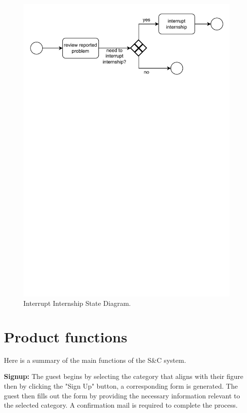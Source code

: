 \begin{figure}[H]
    \begin{center}
        \includegraphics[width=\linewidth]{Images/StateDiagram/InterruptInternship.pdf}
        \caption{Interrupt Internship State Diagram.}
        \label{fig:interrupt_intern_state_diag}%
    \end{center}
\end{figure}


\section{Product functions}
\label{sec:product_functions}%

Here is a summary of the main functions of the S\&C system.

\textbf{Signup:} The guest begins by selecting the category that aligns
with their figure then by clicking the "Sign Up" button, a
corresponding form is generated. The guest then fills out the form by
providing the necessary information relevant to the selected category. A
confirmation mail is required to complete the process.

